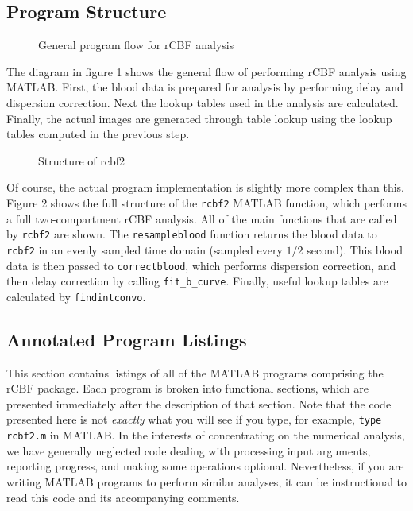 \documentclass[12pt]{article}
\def\code#1{{\tt #1}}
\begin{document}
\subsection{Program Structure}

\begin{figure}
\centerline{\setlength{\epsfysize}{3.0in} }
\caption{General program flow for rCBF analysis}
\end{figure}

The diagram in figure 1 shows the general flow of performing rCBF
analysis using MATLAB.  First, the blood data is prepared for
analysis by performing delay and dispersion correction.  Next the
lookup tables used in the analysis are calculated.  Finally, the
actual images are generated through table lookup using the lookup
tables computed in the previous step.

\begin{figure}
\centerline{\setlength{\epsfysize}{2.0in} }
\caption{Structure of rcbf2}
\end{figure}

Of course, the actual program implementation is slightly more complex
than this.  Figure 2 shows the full structure of the \code{rcbf2}
MATLAB function, which performs a full two-compartment rCBF analysis.
All of the main functions that are called by \code{rcbf2} are shown.
The \code{resampleblood} function returns the blood data to
\code{rcbf2} in an evenly sampled time domain (sampled every $1/2$
second).  This blood data is then passed to \code{correctblood},
which performs dispersion correction, and then delay correction by
calling \code{fit\_b\_curve}.  Finally, useful lookup tables are
calculated by \code{findintconvo}.

\subsection{Annotated Program Listings}

This section contains listings of all of the MATLAB programs
comprising the rCBF package.  Each program is broken into functional
sections, which are presented immediately after the description of
that section.  Note that the code presented here is not {\em exactly}
what you will see if you type, for example, \code{type rcbf2.m} in
MATLAB.  In the interests of concentrating on the numerical analysis,
we have generally neglected code dealing with processing input
arguments, reporting progress, and making some operations optional.
Nevertheless, if you are writing MATLAB programs to perform similar
analyses, it can be instructional to read this code and its
accompanying comments.
\end{document}

